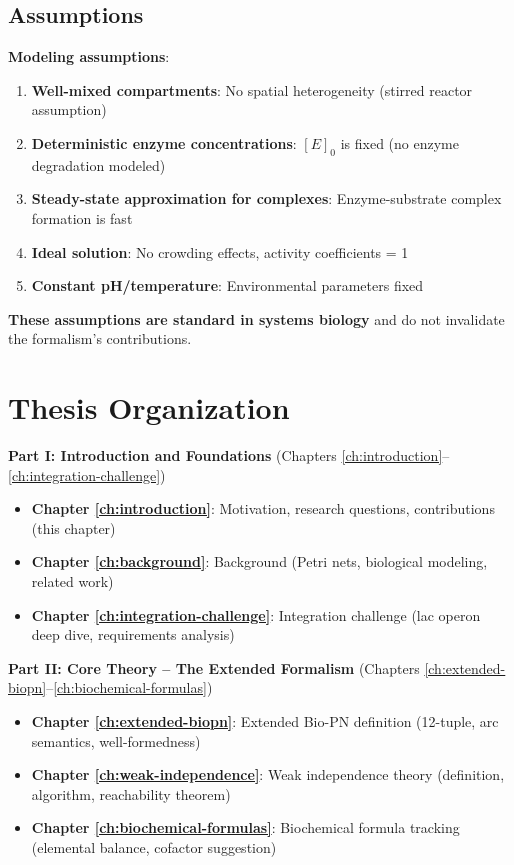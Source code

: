 \subsection{Assumptions}
\label{subsec:assumptions}

\textbf{Modeling assumptions}:

\begin{enumerate}
    \item \textbf{Well-mixed compartments}: No spatial heterogeneity (stirred reactor assumption)
    \item \textbf{Deterministic enzyme concentrations}: $[E]_0$ is fixed (no enzyme degradation modeled)
    \item \textbf{Steady-state approximation for complexes}: Enzyme-substrate complex formation is fast
    \item \textbf{Ideal solution}: No crowding effects, activity coefficients = 1
    \item \textbf{Constant pH/temperature}: Environmental parameters fixed
\end{enumerate}

\textbf{These assumptions are standard in systems biology} and do not invalidate the formalism's contributions.

\section{Thesis Organization}
\label{sec:thesis-organization}

\textbf{Part I: Introduction and Foundations} (Chapters \ref{ch:introduction}--\ref{ch:integration-challenge})

\begin{itemize}
    \item \textbf{Chapter \ref{ch:introduction}}: Motivation, research questions, contributions (this chapter)
    \item \textbf{Chapter \ref{ch:background}}: Background (Petri nets, biological modeling, related work)
    \item \textbf{Chapter \ref{ch:integration-challenge}}: Integration challenge (lac operon deep dive, requirements analysis)
\end{itemize}

\textbf{Part II: Core Theory -- The Extended Formalism} (Chapters \ref{ch:extended-biopn}--\ref{ch:biochemical-formulas})

\begin{itemize}
    \item \textbf{Chapter \ref{ch:extended-biopn}}: Extended Bio-PN definition (12-tuple, arc semantics, well-formedness)
    \item \textbf{Chapter \ref{ch:weak-independence}}: Weak independence theory (definition, algorithm, reachability theorem)
    \item \textbf{Chapter \ref{ch:biochemical-formulas}}: Biochemical formula tracking (elemental balance, cofactor suggestion)
\end{itemize}

